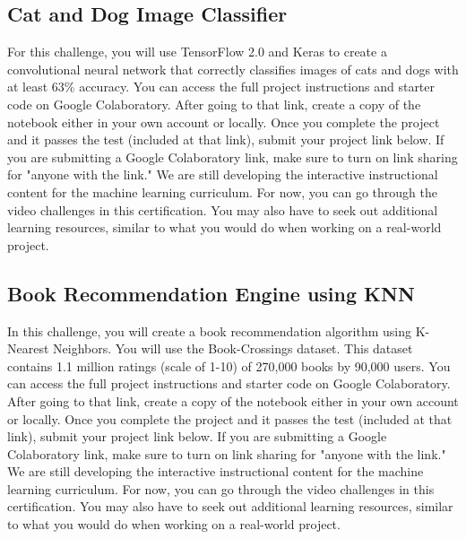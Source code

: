 \documentclass{article}%
\begin{document}
%
\subsection{Cat and Dog Image Classifier}%
\label{subsec:CatandDogImageClassifier}%
For this challenge, you will use TensorFlow 2.0 and Keras to create a convolutional neural network that correctly classifies images of cats and dogs with at least 63\% accuracy.\newline%
You can access the full project instructions and starter code on Google Colaboratory.\newline%
After going to that link, create a copy of the notebook either in your own account or locally. Once you complete the project and it passes the test (included at that link), submit your project link below. If you are submitting a Google Colaboratory link, make sure to turn on link sharing for "anyone with the link."\newline%
We are still developing the interactive instructional content for the machine learning curriculum. For now, you can go through the video challenges in this certification. You may also have to seek out additional learning resources, similar to what you would do when working on a real{-}world project.\newline%

%
\subsection{Book Recommendation Engine using KNN}%
\label{subsec:BookRecommendationEngineusingKNN}%
In this challenge, you will create a book recommendation algorithm using K{-}Nearest Neighbors.\newline%
You will use the Book{-}Crossings dataset. This dataset contains 1.1 million ratings (scale of 1{-}10) of 270,000 books by 90,000 users.\newline%
You can access the full project instructions and starter code on Google Colaboratory.\newline%
After going to that link, create a copy of the notebook either in your own account or locally. Once you complete the project and it passes the test (included at that link), submit your project link below. If you are submitting a Google Colaboratory link, make sure to turn on link sharing for "anyone with the link."\newline%
We are still developing the interactive instructional content for the machine learning curriculum. For now, you can go through the video challenges in this certification. You may also have to seek out additional learning resources, similar to what you would do when working on a real{-}world project.\newline%
\end{document}
